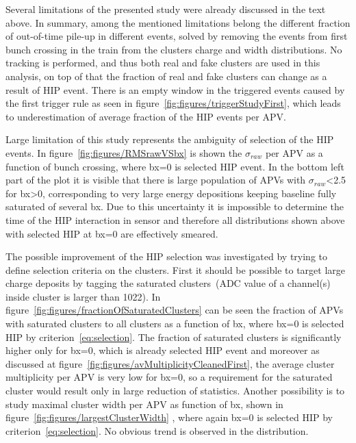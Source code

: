 Several limitations of the presented study were already discussed in the text above. In summary, among the mentioned limitations belong the different fraction of out-of-time pile-up in different events, solved by removing the events from first bunch crossing in the train from the clusters charge and width distributions. No tracking is performed, and thus both real and fake clusters are used in this analysis, on top of that the fraction of real and fake clusters can change as a result of HIP event. There is an empty window in the triggered events caused by the first trigger rule as seen in figure~\ref{fig:figures/triggerStudyFirst}, which leads to underestimation of average fraction of the HIP events per APV.


Large limitation of this study represents the ambiguity of selection of the HIP events. In figure~\ref{fig:figures/RMSrawVSbx} is shown the $\sigma_{raw}$ per APV as a function of bunch crossing, where bx=0 is selected HIP event. In the bottom left part of the plot it is visible that there is large population of APVs with $\sigma_{raw}$<2.5 for bx>0, corresponding to very large energy depositions keeping baseline fully saturated of several bx. Due to this uncertainty it is impossible to determine the time of the HIP interaction in sensor and therefore all distributions shown above with selected HIP at bx=0 are effectively smeared. 


The possible improvement of the HIP selection was investigated by trying to define selection criteria on the clusters. First it should be possible to target large charge deposits by tagging the saturated clusters~(ADC value of a channel(s) inside cluster is larger than 1022). In figure~\ref{fig:figures/fractionOfSaturatedClusters} can be seen the fraction of APVs with saturated clusters to all clusters as a function of bx, where bx=0 is selected HIP by criterion~\ref{eq:selection}. The fraction of saturated clusters is significantly higher only for bx=0, which is already selected HIP event and moreover as discussed at figure~\ref{fig:figures/avMultiplicityCleanedFirst}, the average cluster multiplicity per APV is very low for bx=0, so a requirement for the saturated cluster would result only in large reduction of statistics. Another possibility is to study maximal cluster width per APV as function of bx, shown in figure~\ref{fig:figures/largestClusterWidth} , where again bx=0 is selected HIP by criterion~\ref{eq:selection}. No obvious trend is observed in the distribution. 

